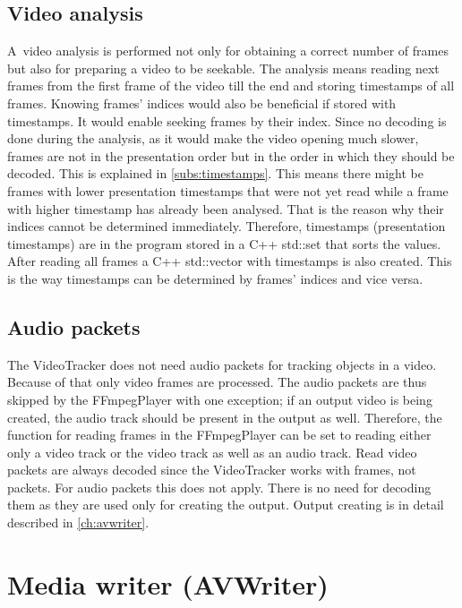 \section{Video analysis}\label{sec:videoanalysis}
A~video analysis is performed not only for obtaining a correct number of frames but also for preparing a video to be seekable. The analysis means reading next frames from the first frame of the video till the end and storing timestamps of all frames. Knowing frames’ indices would also be beneficial if stored with timestamps. It would enable seeking frames by their index. Since no decoding is done during the analysis, as it would make the video opening much slower, frames are not in the presentation order but in the order in which they should be decoded. This is explained in \autoref{subs:timestamps}. This means there might be frames with lower presentation timestamps that were not yet read while a frame with higher timestamp has already been analysed. That is the reason why their indices cannot be determined immediately. Therefore, timestamps (presentation timestamps) are in the program stored in a C++ std::set that sorts the values. After reading all frames a C++ std::vector with timestamps is also created. This is the way timestamps can be determined by frames’ indices and vice versa.

\section{Audio packets}\label{sec:audiopackets}
The VideoTracker does not need audio packets for tracking objects in a video. Because of that only video frames are processed. The audio packets are thus skipped by the FFmpegPlayer with one exception; if an output video is being created, the audio track should be present in the output as well. Therefore, the function for reading frames in the FFmpegPlayer can be set to reading either only a video track or the video track as well as an audio track. Read video packets are always decoded since the VideoTracker works with frames, not packets. For audio packets this does not apply. There is no need for decoding them as they are used only for creating the output. Output creating is in detail described in \autoref{ch:avwriter}.

\chapter{Media writer (AVWriter)}\label{ch:avwriter}
